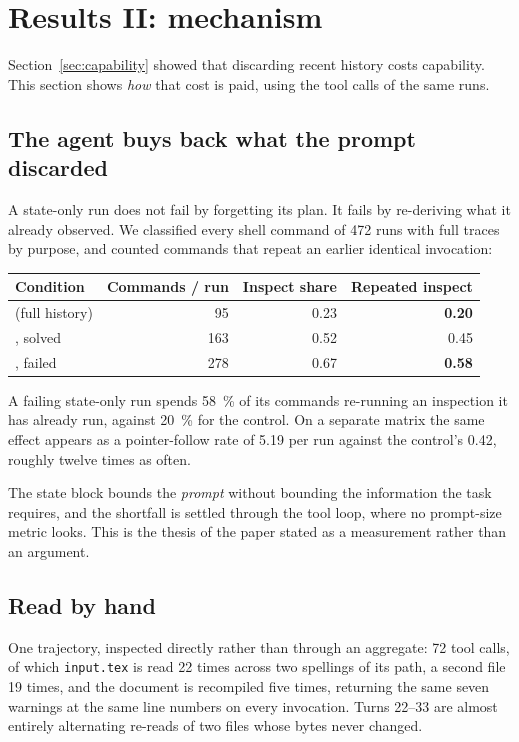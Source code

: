 \section{Results II: mechanism}
\label{sec:mechanism}

Section~\ref{sec:capability} showed that discarding recent history costs
capability. This section shows \emph{how} that cost is paid, using the tool
calls of the same runs.

\subsection{The agent buys back what the prompt discarded}

A state-only run does not fail by forgetting its plan. It fails by
re-deriving what it already observed. We classified every shell command of
472 runs with full traces by purpose, and counted commands that repeat an
earlier identical invocation\live:

\begin{center}
\begin{tabular}{@{}lrrr@{}}
\toprule
Condition & Commands / run & Inspect share & \textbf{Repeated inspect} \\
\midrule
\Control{} (full history) & 95  & 0.23 & \textbf{0.20} \\
\StateOnly{}, solved      & 163 & 0.52 & 0.45 \\
\StateOnly{}, failed      & 278 & 0.67 & \textbf{0.58} \\
\bottomrule
\end{tabular}
\end{center}

A failing state-only run spends \SI{58}{\percent} of its commands re-running
an inspection it has already run, against \SI{20}{\percent} for the control.
On a separate matrix the same effect appears as a pointer-follow rate of 5.19
per run against the control's 0.42, roughly twelve times as often\live.

The state block bounds the \emph{prompt} without bounding the information
the task requires, and the shortfall is settled through the tool loop, where
no prompt-size metric looks. This is the thesis of the paper stated as a
measurement rather than an argument.

\subsection{Read by hand}

One trajectory, inspected directly rather than through an aggregate\live:
72 tool calls, of which \texttt{input.tex} is read 22 times across two
spellings of its path, a second file 19 times, and the document is
recompiled five times, returning the same seven warnings at the same line
numbers on every invocation. Turns 22--33 are almost entirely alternating
re-reads of two files whose bytes never changed.

